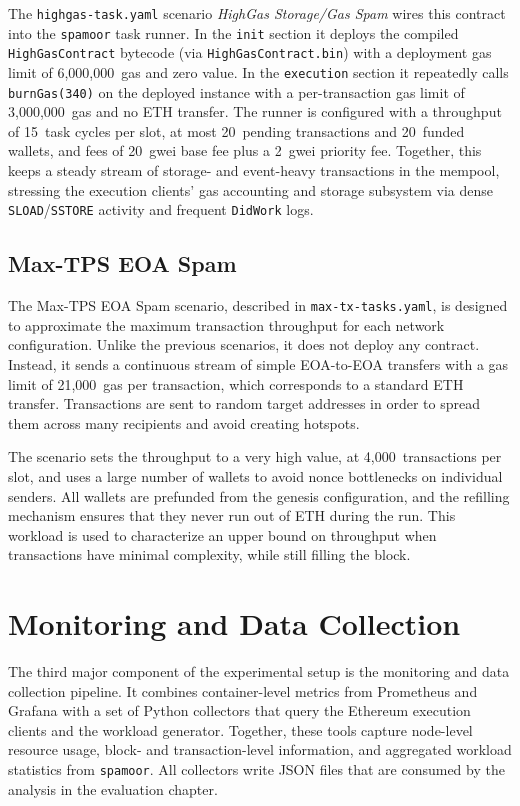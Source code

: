The \texttt{highgas-task.yaml} scenario \emph{HighGas Storage/Gas Spam} wires this contract into the \texttt{spamoor} task runner. In the \texttt{init} section it deploys the compiled \texttt{HighGasContract} bytecode (via \texttt{HighGasContract.bin}) with a deployment gas limit of 6{,}000{,}000~gas and zero value. In the \texttt{execution} section it repeatedly calls \texttt{burnGas(340)} on the deployed instance with a per-transaction gas limit of 3{,}000{,}000~gas and no ETH transfer. The runner is configured with a throughput of 15~task cycles per slot, at most 20~pending transactions and 20~funded wallets, and fees of 20~gwei base fee plus a 2~gwei priority fee. Together, this keeps a steady stream of storage- and event-heavy transactions in the mempool, stressing the execution clients’ gas accounting and storage subsystem via dense \texttt{SLOAD}/\texttt{SSTORE} activity and frequent \texttt{DidWork} logs.

\subsection{Max-TPS EOA Spam}

The Max-TPS EOA Spam scenario, described in \texttt{max-tx-tasks.yaml}, is designed to approximate the maximum transaction throughput for each network configuration. Unlike the previous scenarios, it does not deploy any contract. Instead, it sends a continuous stream of simple EOA-to-EOA transfers with a gas limit of 21{,}000~gas per transaction, which corresponds to a standard ETH transfer. Transactions are sent to random target addresses in order to spread them across many recipients and avoid creating hotspots.

The scenario sets the throughput to a very high value, at 4{,}000~transactions per slot, and uses a large number of wallets to avoid nonce bottlenecks on individual senders. All wallets are prefunded from the genesis configuration, and the refilling mechanism ensures that they never run out of ETH during the run. This workload is used to characterize an upper bound on throughput when transactions have minimal complexity, while still filling the block.

\section{Monitoring and Data Collection}

The third major component of the experimental setup is the monitoring and data collection pipeline. It combines container-level metrics from Prometheus and Grafana with a set of Python collectors that query the Ethereum execution clients and the workload generator. Together, these tools capture node-level resource usage, block- and transaction-level information, and aggregated workload statistics from \texttt{spamoor}. All collectors write JSON files that are consumed by the analysis in the evaluation chapter.

